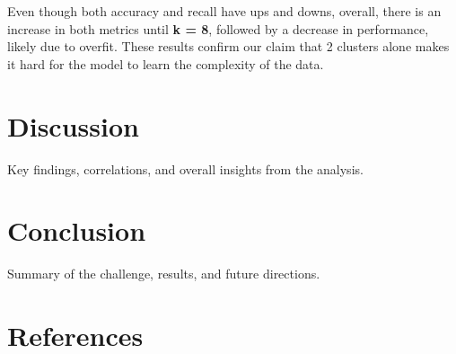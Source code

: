 \documentclass[a4paper,12pt]{article}
\begin{document}
Even though both accuracy and recall have ups and downs, overall, there is an increase in both metrics until \textbf{k = 8}, followed by a decrease in performance, likely due to overfit. These results confirm our claim that 2 clusters alone makes it hard for the model to learn the complexity of the data.

\section{Discussion}
\label{sec:discussion}
Key findings, correlations, and overall insights from the analysis.

\section{Conclusion}
\label{sec:conclusion}
Summary of the challenge, results, and future directions.

\section*{References}
\label{sec:references}
\end{document}
